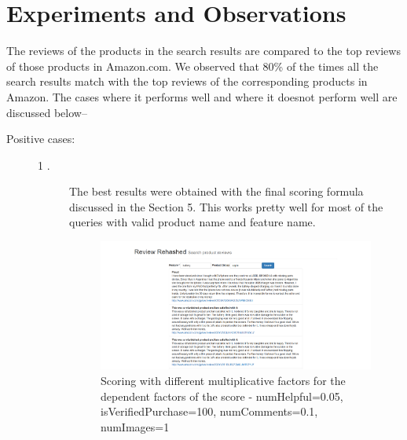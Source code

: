 \documentclass{article}
\begin{document}
\section{Experiments and Observations}
The reviews of the products in the search results are compared to the top reviews of those products in Amazon.com. We observed that 80\% of the times all the search results match with the top reviews of the corresponding products in Amazon. The cases where it performs well and where it doesnot perform well are discussed below--
	\begin{description}
		\item[Positive cases:] 
			\begin{description}
				\item[1 .] The best results were obtained with the final scoring formula discussed in the Section 5. This works pretty well for most of the queries with valid product name and feature name.
					\begin{figure}[ht!]
					  \centering
					  \includegraphics[width=1\textwidth]{scoring_piecewise_normalization}
					  \caption{Scoring with different multiplicative factors for the dependent factors of the score - numHelpful=0.05, isVerifiedPurchase=100, numComments=0.1, numImages=1~\label{fig:Search_Engine}}
					\end{figure}

			\end{description}
	\end{description}
\end{document}
